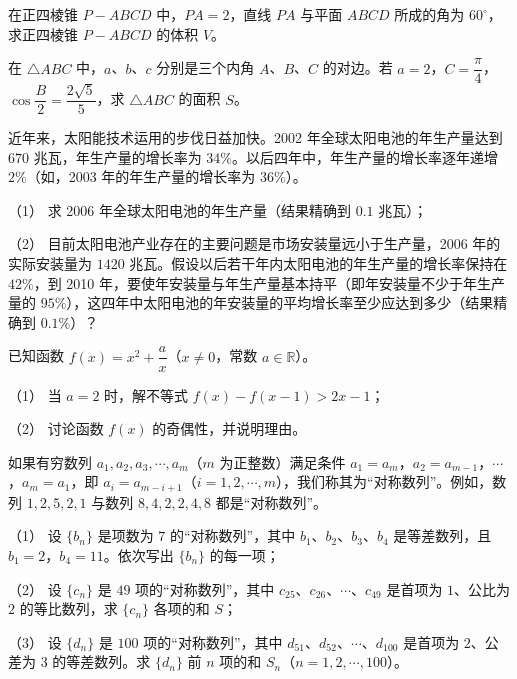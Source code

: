\Needspace{0.4\textheight}
\begin{question}
在正四棱锥 $P-ABCD$ 中，$PA=2$，直线 $PA$ 与平面 $ABCD$ 所成的角为 $60^\circ$，求正四棱锥 $P-ABCD$ 的体积 $V$。
\nopagebreak[4]
\begin{center}\end{center}
\nopagebreak[4]
\end{question}
\begin{question}
在 $\triangle ABC$ 中，$a$、$b$、$c$ 分别是三个内角 $A$、$B$、$C$ 的对边。若 $a=2$，$C=\dfrac{\pi}{4}$，$\cos\dfrac{B}{2}=\dfrac{2\sqrt{5}}{5}$，求 $\triangle ABC$ 的面积 $S$。

\end{question}
\begin{question}
近年来，太阳能技术运用的步伐日益加快。2002 年全球太阳电池的年生产量达到 $670$ 兆瓦，年生产量的增长率为 $34\%$。以后四年中，年生产量的增长率逐年递增 $2\%$（如，2003 年的年生产量的增长率为 $36\%$）。

（1） 求 2006 年全球太阳电池的年生产量（结果精确到 $0.1$ 兆瓦）；

（2） 目前太阳电池产业存在的主要问题是市场安装量远小于生产量，2006 年的实际安装量为 $1420$ 兆瓦。假设以后若干年内太阳电池的年生产量的增长率保持在 $42\%$，到 2010 年，要使年安装量与年生产量基本持平（即年安装量不少于年生产量的 $95\%$），这四年中太阳电池的年安装量的平均增长率至少应达到多少（结果精确到 $0.1\%$）？

\end{question}
\begin{question}
已知函数 $f(x)=x^2+\dfrac{a}{x}$（$x\ne0$，常数 $a\in\mathbb{R}$）。

（1） 当 $a=2$ 时，解不等式 $f(x)-f(x-1)>2x-1$；

（2） 讨论函数 $f(x)$ 的奇偶性，并说明理由。

\end{question}
\begin{question}
如果有穷数列 $a_1,a_2,a_3,\cdots,a_m$（$m$ 为正整数）满足条件 $a_1=a_m$，$a_2=a_{m-1}$，$\cdots$，$a_m=a_1$，即 $a_i=a_{m-i+1}$（$i=1,2,\cdots,m$），我们称其为“对称数列”。例如，数列 $1,2,5,2,1$ 与数列 $8,4,2,2,4,8$ 都是“对称数列”。

（1） 设 $\{b_n\}$ 是项数为 $7$ 的“对称数列”，其中 $b_1$、$b_2$、$b_3$、$b_4$ 是等差数列，且 $b_1=2$，$b_4=11$。依次写出 $\{b_n\}$ 的每一项；

（2） 设 $\{c_n\}$ 是 $49$ 项的“对称数列”，其中 $c_{25}$、$c_{26}$、$\cdots$、$c_{49}$ 是首项为 $1$、公比为 $2$ 的等比数列，求 $\{c_n\}$ 各项的和 $S$；

（3） 设 $\{d_n\}$ 是 $100$ 项的“对称数列”，其中 $d_{51}$、$d_{52}$、$\cdots$、$d_{100}$ 是首项为 $2$、公差为 $3$ 的等差数列。求 $\{d_n\}$ 前 $n$ 项的和 $S_n$（$n=1,2,\cdots,100$）。

\Needspace{0.4\textheight}
\end{question}
